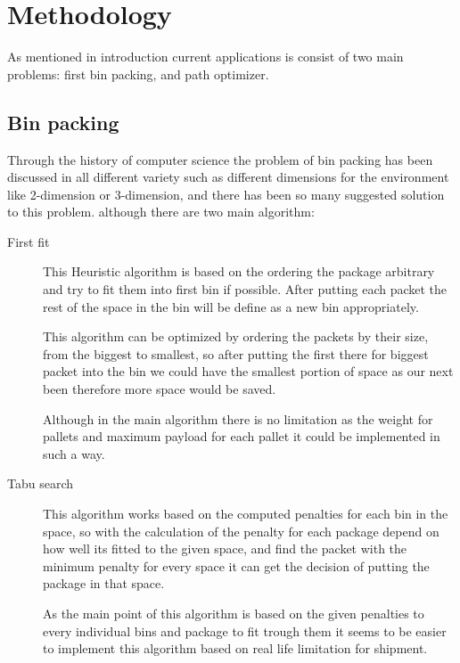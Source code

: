 \documentclass[oneside,titlepage,12pt]{memoir}
\begin{document}
\clearpage


\mainmatter %

\chapter{Methodology}


As mentioned in introduction current applications is consist of two main problems: first bin packing, and path optimizer.

\section{Bin packing}
Through the history of computer science the problem of bin packing has been discussed in all different variety such as different dimensions for the environment like 2-dimension or 3-dimension, and there has been so many suggested solution to this problem. although there are two main algorithm:

\begin{description}
\item[First fit]
This Heuristic algorithm is based on the ordering the package arbitrary and try to fit them into first bin if possible. After putting each packet the rest of the space in the bin will be define as a new bin appropriately.

This algorithm can be optimized by ordering the packets by their size, from the biggest to smallest, so after putting the first there for biggest packet into the bin we could have the smallest portion of space as our next been therefore more space would be saved.

Although in the main algorithm there is no limitation as the weight for pallets and maximum payload for each pallet it could be implemented in such a way.
   
\item[Tabu search]
This algorithm works based on the computed penalties for each bin in the space, so with the calculation of the penalty for each package depend on how well its fitted to the given space, and find the packet with the minimum penalty for every space it can get the decision of putting the package in that space.


As the main point of this algorithm is based on the given penalties to every individual bins and package to fit trough them it seems to be easier to implement this algorithm based on real life limitation for shipment.
\end{description}
\end{document}
